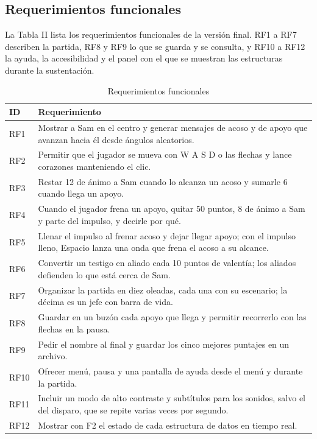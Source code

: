 \documentclass[conference]{IEEEtran}
\begin{document}
\subsection{Requerimientos funcionales}

La Tabla II lista los requerimientos funcionales de la versión final. RF1 a RF7 describen la partida, RF8 y RF9 lo que se guarda y se consulta, y RF10 a RF12 la ayuda, la accesibilidad y el panel con el que se muestran las estructuras durante la sustentación.

\begin{table}[!htbp]
\centering
\caption{Requerimientos funcionales}
\footnotesize
\begin{tabularx}{\textwidth}{|P{2.6cm}|X|}
\hline
\textbf{ID} & \textbf{Requerimiento} \\ \hline
RF1 & Mostrar a Sam en el centro y generar mensajes de acoso y de apoyo que avanzan hacia él desde ángulos aleatorios. \\ \hline
RF2 & Permitir que el jugador se mueva con W A S D o las flechas y lance corazones manteniendo el clic. \\ \hline
RF3 & Restar 12 de ánimo a Sam cuando lo alcanza un acoso y sumarle 6 cuando llega un apoyo. \\ \hline
RF4 & Cuando el jugador frena un apoyo, quitar 50 puntos, 8 de ánimo a Sam y parte del impulso, y decirle por qué. \\ \hline
RF5 & Llenar el impulso al frenar acoso y dejar llegar apoyo; con el impulso lleno, Espacio lanza una onda que frena el acoso a su alcance. \\ \hline
RF6 & Convertir un testigo en aliado cada 10 puntos de valentía; los aliados defienden lo que está cerca de Sam. \\ \hline
RF7 & Organizar la partida en diez oleadas, cada una con su escenario; la décima es un jefe con barra de vida. \\ \hline
RF8 & Guardar en un buzón cada apoyo que llega y permitir recorrerlo con las flechas en la pausa. \\ \hline
RF9 & Pedir el nombre al final y guardar los cinco mejores puntajes en un archivo. \\ \hline
RF10 & Ofrecer menú, pausa y una pantalla de ayuda desde el menú y durante la partida. \\ \hline
RF11 & Incluir un modo de alto contraste y subtítulos para los sonidos, salvo el del disparo, que se repite varias veces por segundo. \\ \hline
RF12 & Mostrar con F2 el estado de cada estructura de datos en tiempo real. \\ \hline
\end{tabularx}
\end{table}
\end{document}
